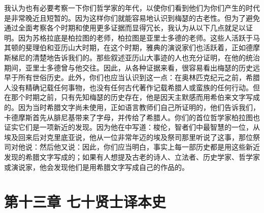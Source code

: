 我认为也有必要考察一下你们哲学家的年代，以使你们看到他们为你们产生的时代是非常晚近且短暂的。因为这样你们就能容易地认识到梅瑟的古老性。但为了避免通过全面考察各个时期和使用更多证据而显得冗长，我认为从以下几点就足以证明。因为苏格拉底是柏拉图的老师，柏拉图是亚里士多德的老师。这些人活跃于马其顿的斐理伯和亚历山大时期，在这个时期，雅典的演说家们也活跃着，正如德摩斯梯尼的清楚地告诉我们的。那些叙述亚历山大事迹的人也充分证明，在他的统治期间，亚里士多德曾与他交往。因此，从各种证据来看，很容易看出梅瑟的历史远早于所有世俗历史。此外，你们也应当认识到这一点：在奥林匹克纪元之前，希腊人没有精确记载任何事物，也没有任何古代著作记载希腊人或蛮族的任何行动。但在那个时期之前，只有先知梅瑟的历史存在，他是因天主默感而用希伯来文字写成的。因为当时希腊文字尚未使用，正如语言教师们自己所证明的，他们告诉我们，卡德摩斯首先从腓尼基带来了字母，并传给了希腊人。你们的首位哲学家柏拉图也证实它们是一项新近的发现。因为他在中写道：梭伦，智者们中最智慧的一位，从埃及回来后对克里底亚说，他从一位非常年迈的埃及祭司那里听说了这事，那位祭司对他说：然后他又说：因此，你们应当明白，事实上每一部历史都是用这些新近发现的希腊文字写成的；如果有人想提及古老的诗人、立法者、历史学家、哲学家或演说家，他会发现他们是用希腊文字写成自己的作品的。\par


\section{第十三章 七十贤士译本史}

